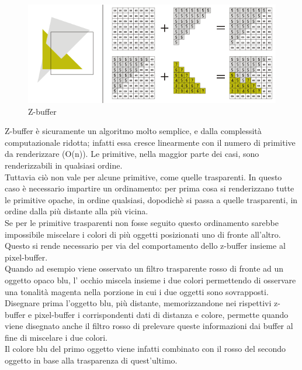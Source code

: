 \begin{figure}[htb]
 \centering
 \includegraphics[width=1.0\linewidth]{images/chapter_stato_arte/stato_arte_z_buffer.png}\hfill
 \caption[Z-buffer]{Z-buffer}
 \label{fig:stato_arte_z_buffer}
\end{figure}
Z-buffer è sicuramente un algoritmo molto semplice, e dalla complessità computazionale ridotta; infatti essa cresce linearmente con il numero di primitive da renderizzare (O(n)). Le primitive, nella maggior parte dei casi, sono renderizzabili in qualsiasi ordine.
\\
Tuttavia ciò non vale per alcune primitive, come quelle trasparenti. In questo caso è necessario impartire un ordinamento: per prima cosa si renderizzano tutte le primitive opache, in ordine qualsiasi, dopodichè si passa a quelle trasparenti, in ordine dalla più distante alla più vicina.
\\
Se per le primitive trasparenti non fosse seguito questo ordinamento sarebbe impossibile miscelare i colori di più oggetti posizionati uno di fronte all’altro. Questo si rende necessario per via del comportamento dello z-buffer insieme al pixel-buffer.
\\
Quando ad esempio viene osservato un filtro trasparente rosso di fronte ad un oggetto opaco blu, l’ occhio miscela insieme i due colori permettendo di osservare una tonalità magenta nella porzione in cui i due oggetti sono sovrapposti.
\\
Disegnare prima l’oggetto blu, più distante, memorizzandone nei rispettivi z-buffer e pixel-buffer i corrispondenti dati di distanza e colore, permette quando viene disegnato anche il filtro rosso di prelevare queste informazioni dai buffer al fine di miscelare i due colori.
\\
Il colore blu del primo oggetto viene infatti combinato con il rosso del secondo oggetto in base alla trasparenza di quest’ultimo.
\\
